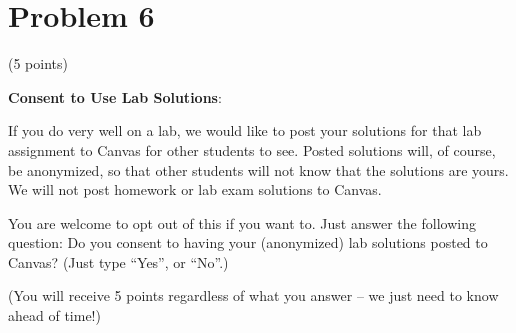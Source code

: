 \documentclass[]{article}
\begin{document}
\hypertarget{problem-6}{%
\section{Problem 6}\label{problem-6}}

(5 points)

\textbf{Consent to Use Lab Solutions}:

If you do very well on a lab, we would like to post your solutions for
that lab assignment to Canvas for other students to see. Posted
solutions will, of course, be anonymized, so that other students will
not know that the solutions are yours. We will not post homework or lab
exam solutions to Canvas.

You are welcome to opt out of this if you want to. Just answer the
following question: Do you consent to having your (anonymized) lab
solutions posted to Canvas? (Just type ``Yes'', or ``No''.)

(You will receive 5 points regardless of what you answer -- we just need
to know ahead of time!)
\end{document}
